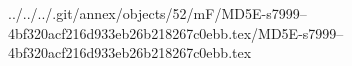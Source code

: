 ../../../.git/annex/objects/52/mF/MD5E-s7999--4bf320acf216d933eb26b218267c0ebb.tex/MD5E-s7999--4bf320acf216d933eb26b218267c0ebb.tex